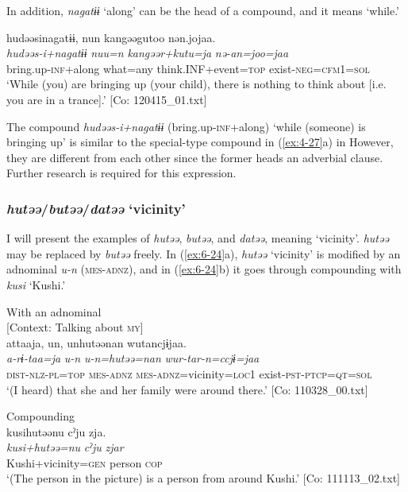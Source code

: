 In addition, \textit{nagatɨɨ} ‘along’ can be the head of a compound, and it means ‘while.’

\ea\label{ex:6-23}
{\TM}
\glll hudəəsinagatɨɨ,  nun  kangəəgutoo  nən.jojaa.\\
\textit{hudəəs-i+nagatɨɨ}  \textit{nuu=n}  \textit{kangəər+kutu=ja}  \textit{nə-an=joo=jaa}\\
    bring.up-\textsc{inf}+along  what=any  think.INF+event=\textsc{top}  exist-\textsc{neg}=\textsc{cfm}1=\textsc{sol}\\
\glt    ‘While (you) are bringing up (your child), there is nothing to think about [i.e. you are in a trance].’ [Co: 120415\_01.txt]
\z

The compound \textit{hudəəs-i+nagatɨɨ} (bring.up-\textsc{inf}+along) ‘while (someone) is bringing up’ is similar to the special-type compound in (\ref{ex:4-27}a) in  However, they are different from each other since the former heads an adverbial clause. Further research is required for this expression.

\subsubsection{\textit{hutəə}/\textit{butəə}/\textit{datəə} ‘vicinity’}

I will present the examples of \textit{hutəə}, \textit{butəə}, and \textit{datəə}, meaning ‘vicinity’. \textit{hutəə} may be replaced by \textit{butəə} freely. In (\ref{ex:6-24}a), \textit{hutəə} ‘vicinity’ is modified by an adnominal \textit{u-n} (\textsc{mes}-\textsc{adnz}), and in (\ref{ex:6-24}b) it goes through compounding with \textit{kusi} ‘Kushi.’

\ea\label{ex:6-24}
\ea With an adnominal\\{}
[Context: Talking about \textsc{my}]\\
{\TM}
\glll attaaja,  un,  unhutəənan   wutancjɨjaa.\\
      \textit{a-rɨ-taa=ja}  \textit{u-n}  \textit{u-n=hutəə=nan} \textit{wur-tar-n=ccjɨ=jaa}\\
      \textsc{dist}-\textsc{nlz}-\textsc{pl}=\textsc{top}  \textsc{mes}-\textsc{adnz}  \textsc{mes}-\textsc{adnz}=vicinity=\textsc{loc1}     exist-\textsc{pst}-\textsc{ptcp}=\textsc{qt}=\textsc{sol}\\
\glt ‘(I heard) that she and her family were around there.’ [Co: 110328\_00.txt]

\ex Compounding\\
{\TM}
\glll  kusihutəənu  cˀju  zja.\\
\textit{kusi+hutəə=nu}  \textit{cˀju}  \textit{zjar}\\
Kushi+vicinity=\textsc{gen}  person  \textsc{cop}\\
\glt ‘(The person in the picture) is a person from around Kushi.’ [Co: 111113\_02.txt]
\z
\z

